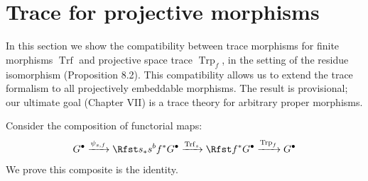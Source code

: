 
\setcounter{page}{200}
\section{Trace for projective morphisms}

In this section we show the compatibility between trace morphisms for finite morphisms $\operatorname{Trf}$ and projective space trace $\operatorname{Trp}_f$, in the setting of the residue isomorphism (Proposition 8.2). This compatibility allows us to extend the trace formalism to all projectively embeddable morphisms. The result is provisional; our ultimate goal (Chapter VII) is a trace theory for arbitrary proper morphisms.

Consider the composition of functorial maps:
\[
G^\bullet \xrightarrow{\psi_{s,f}}
\Rfst s_* s^b f^* G^\bullet
\xrightarrow{\operatorname{Trf}_s}
\Rfst f^* G^\bullet
\xrightarrow{\operatorname{Trp}_f}
G^\bullet
\]
We prove this composite is the identity.

